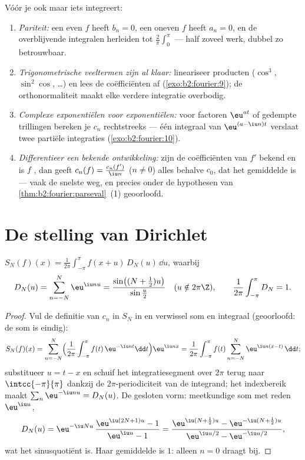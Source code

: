 \begin{method}\label{met:b2:fourier:coefficients}
Vóór je ook maar iets integreert:
\begin{enumerate}
  \item \emph{Pariteit:} een even $f$ heeft $b_n = 0$, een oneven
        $f$ heeft $a_n = 0$, en de overblijvende integralen
        herleiden tot $\frac2\pi \int_0^\pi$ --- half zoveel werk,
        dubbel zo betrouwbaar.
  \item \emph{Trigonometrische veeltermen zijn al klaar:}
        lineariseer producten ($\cos^3$, $\sin^2\cos$, \dots) en
        lees de coëfficiënten af (\cref{exo:b2:fourier:9}); de
        orthonormaliteit maakt elke verdere integratie
        overbodig.
  \item \emph{Complexe exponentiëlen voor exponentiëlen:} voor
        factoren $\eu^{at}$ of gedempte trillingen bereken je
        $c_n$ rechtstreeks --- één integraal van $\eu^{(a - \iu
        n)t}$ verslaat twee partiële integraties
        (\cref{exo:b2:fourier:10}).
  \item \emph{Differentieer een bekende ontwikkeling:} zijn de
        coëfficiënten van $f'$ bekend en is $f$ , dan geeft
        $c_n(f) = \frac{c_n(f')}{\iu n}$ ($n \neq 0$) alles behalve
        $c_0$, dat het gemiddelde is --- vaak de snelste weg, en
        precies onder de hypothesen van
        \cref{thm:b2:fourier:parseval}~(1) geoorloofd.
\end{enumerate}
\end{method}

\section{De stelling van Dirichlet}

\begin{lemma}\label{lem:b2:fourier:kernel}
$S_N(f)(x) = \frac{1}{2\pi}\int_{-\pi}^{\pi} f(x + u)\,D_N(u)\,\dd
u$, waarbij
\[
D_N(u) = \sum_{n=-N}^{N} \eu^{\iu nu}
= \frac{\sin\bigl((N + \frac12)u\bigr)}{\sin\frac u2}
\quad (u \notin 2\pi\Z),
\qquad
\frac{1}{2\pi}\int_{-\pi}^{\pi} D_N = 1 .
\]
\end{lemma}

\begin{proof}
Vul de definitie van $c_n$ in $S_N$ in en verwissel som en
integraal (geoorloofd: de som is eindig):
\[
S_N(f)(x)
= \sum_{n=-N}^{N}\Bigl(\frac{1}{2\pi}\int_{-\pi}^{\pi}
f(t)\,\eu^{-\iu nt}\dd t\Bigr)\eu^{\iu nx}
= \frac{1}{2\pi}\int_{-\pi}^{\pi} f(t)
\sum_{n=-N}^{N}\eu^{\iu n(x-t)}\,\dd t ;
\]
substitueer $u = t - x$ en schuif het integratiesegment over
$2\pi$ terug naar $\intcc{-\pi}{\pi}$ dankzij de
$2\pi$-periodiciteit van de integrand; het 
indexbereik maakt $\sum_n\eu^{-\iu nu} = D_N(u)$. De gesloten
vorm: meetkundige som met reden $\eu^{\iu u}$,
\[
D_N(u) = \eu^{-\iu Nu}\,\frac{\eu^{\iu(2N+1)u} - 1}{\eu^{\iu u} -
1}
= \frac{\eu^{\iu(N + \frac12)u} - \eu^{-\iu(N+\frac12)u}}
{\eu^{\iu u/2} - \eu^{-\iu u/2}} ,
\]
wat het sinusquotiënt is. Haar gemiddelde is $1$: alleen $n = 0$
draagt bij.
\end{proof}

